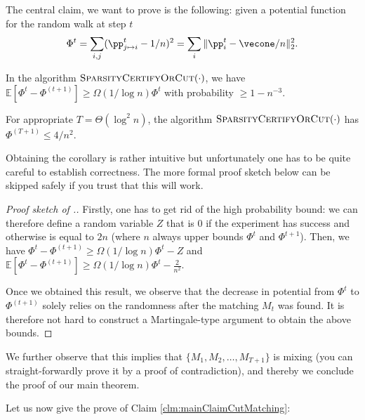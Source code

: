 The central claim, we want to prove is the following: given a potential function for the random walk at step $t$
\[
    \Phi^t = \sum_{i,j} (\pp_{j \mapsto i}^t - 1/n)^2 = \sum_{i} \|\pp_{i}^t - \vecone/n\|_2^2.
\]
\begin{claim}\label{clm:mainClaimCutMatching}
In the algorithm $\textsc{SparsityCertifyOrCut}(\cdot)$, we have $\mathbb{E}[\Phi^{t} - \Phi^{(t+1)}] \geq \Omega(1/\log n) \Phi^{t}$ with probability $\geq 1 - n^{-3}$.
\end{claim}
\begin{corollary}\label{cor:fewRoundsCutMathcing}
For appropriate $T = \Theta(\log^2 n)$, the algorithm $\textsc{SparsityCertifyOrCut}(\cdot)$ has $\Phi^{(T+1)} \leq 4/n^2$.
\end{corollary}

Obtaining the corollary is rather intuitive but unfortunately one has to be quite careful to establish correctness. The more formal proof sketch below can be skipped safely if you trust that this will work.

\begin{proof}[Proof sketch of .]Firstly, one has to get rid of the high probability bound: we can therefore define a random variable $Z$ that is $0$ if the experiment has success and otherwise is equal to $2n$ (where $n$ always upper bounds $\Phi^t$ and $\Phi^{t+1}$). Then, we have $\Phi^{t} - \Phi^{(t+1)} \geq \Omega(1/\log n) \Phi^{t} - Z$ and $\mathbb{E}[\Phi^{t} - \Phi^{(t+1)}] \geq \Omega(1/\log n) \Phi^{t} - \frac{2}{n^2}$.

Once we obtained this result, we observe that the decrease in potential from $\Phi^t$ to $\Phi^{(t+1)}$ solely relies on the randomness after the matching $M_t$ was found. It is therefore not hard to construct a Martingale-type argument to obtain the above bounds.
\end{proof}

We further observe that this implies that $\{M_1, M_2, \dots, M_{T+1}\}$ is mixing (you can straight-forwardly prove it by a proof of contradiction), and thereby we conclude the proof of our main theorem. 

Let us now give the prove of Claim \ref{clm:mainClaimCutMatching}: 

